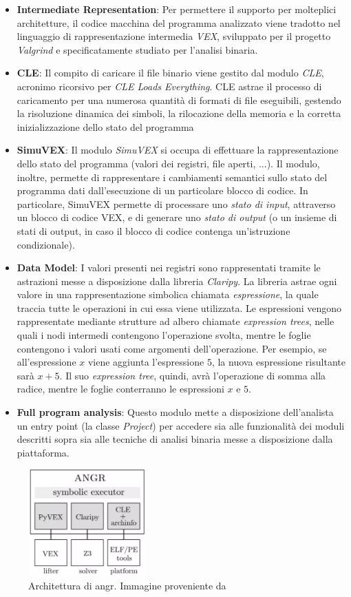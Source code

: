 \documentclass[../main.tex]{subfiles}
\begin{document}
\begin{itemize}
    \item \textbf{Intermediate Representation}: Per permettere il supporto per molteplici architetture, il codice macchina del programma analizzato viene tradotto nel linguaggio di rappresentazione intermedia \textit{VEX}, sviluppato per il progetto \textit{Valgrind} e specificatamente studiato per l'analisi binaria.
    \item \textbf{CLE}: Il compito di caricare il file binario viene gestito dal modulo \textit{CLE}, acronimo ricorsivo per \textit{CLE Loads Everything}. CLE astrae il processo di caricamento per una numerosa quantità di formati di file eseguibili, gestendo la risoluzione dinamica dei simboli, la rilocazione della memoria
    e la corretta inizializzazione dello stato del programma
    \item \textbf{SimuVEX}: Il modulo \textit{SimuVEX} si occupa di effettuare la rappresentazione dello stato del programma (valori dei registri, file aperti, ...). Il modulo, inoltre, permette di rappresentare i cambiamenti semantici sullo stato del programma dati dall'esecuzione di un particolare blocco di codice. In particolare, SimuVEX permette
    di processare uno \textit{stato di input}, attraverso un blocco di codice VEX, e di generare uno \textit{stato di output} (o un insieme di stati di output, in caso il blocco di codice contenga un'istruzione condizionale). 
    \item \textbf{Data Model}: I valori presenti nei registri sono rappresentati tramite le astrazioni messe a disposizione dalla libreria \textit{Claripy}. 
    La libreria astrae ogni valore in una rappresentazione simbolica chiamata \textit{espressione}, la quale traccia tutte le operazioni in cui essa viene utilizzata.
    Le espressioni vengono rappresentate mediante strutture ad albero chiamate \textit{expression trees}, nelle quali i nodi intermedi contengono l'operazione svolta, mentre le foglie contengono i valori usati come argomenti dell'operazione.
    Per esempio, se all'espressione $x$ viene aggiunta l'espressione $5$, la nuova espressione risultante sarà $x+5$. Il suo \textit{expression tree}, quindi, avrà l'operazione di somma alla radice, mentre le foglie conterranno le espressioni $x$ e $5$.
    \item \textbf{Full program analysis}: Questo modulo mette a disposizione dell'analista un entry point (la classe \textit{Project}) per accedere sia alle funzionalità dei moduli descritti sopra sia alle tecniche di analisi binaria messe a disposizione dalla piattaforma.
\end{itemize}
\begin{figure}[H]
    \centering
    \includegraphics[width = 0.40\textwidth]{../images/angr_architecture.png}
    \caption{Architettura di angr. Immagine proveniente da \cite{angr_architecture}}
\end{figure}
\end{document}

